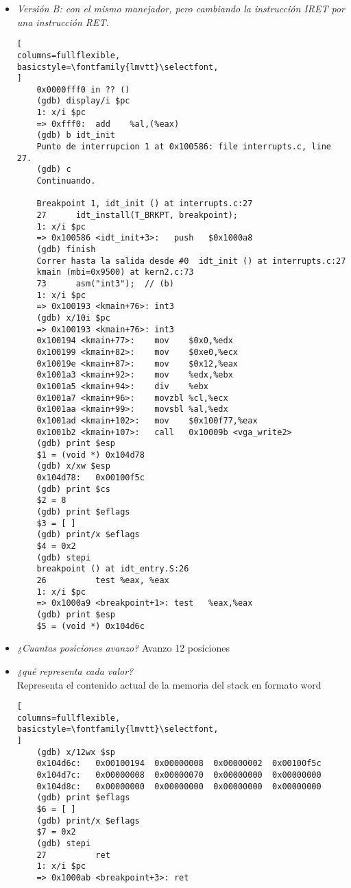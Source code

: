 \documentclass[a4paper, 12pt]{article}
\begin{document}
\begin{itemize}
\begin{lstlisting}[
columns=fullflexible,
basicstyle=\fontfamily{lmvtt}\selectfont,
]
	(gdb) print $cs
	$13 = 8
	(gdb) print $eflags
	$10 = [ ]
	(gdb) print/x $eflags
	$11 = 0x2
\end{lstlisting}
				\item \textit{Versión B: con el mismo manejador, pero cambiando
				la instrucción IRET por una instrucción RET.\\}
\begin{lstlisting}[
columns=fullflexible,
basicstyle=\fontfamily{lmvtt}\selectfont,
]
	0x0000fff0 in ?? ()
	(gdb) display/i $pc
	1: x/i $pc
	=> 0xfff0:	add    %al,(%eax)
	(gdb) b idt_init
	Punto de interrupcion 1 at 0x100586: file interrupts.c, line 27.
	(gdb) c
	Continuando.

	Breakpoint 1, idt_init () at interrupts.c:27
	27	    idt_install(T_BRKPT, breakpoint);
	1: x/i $pc
	=> 0x100586 <idt_init+3>:	push   $0x1000a8
	(gdb) finish
	Correr hasta la salida desde #0  idt_init () at interrupts.c:27
	kmain (mbi=0x9500) at kern2.c:73
	73	    asm("int3");  // (b)
	1: x/i $pc
	=> 0x100193 <kmain+76>:	int3
	(gdb) x/10i $pc
	=> 0x100193 <kmain+76>:	int3
	0x100194 <kmain+77>:	mov    $0x0,%edx
	0x100199 <kmain+82>:	mov    $0xe0,%ecx
	0x10019e <kmain+87>:	mov    $0x12,%eax
	0x1001a3 <kmain+92>:	mov    %edx,%ebx
	0x1001a5 <kmain+94>:	div    %ebx
	0x1001a7 <kmain+96>:	movzbl %cl,%ecx
	0x1001aa <kmain+99>:	movsbl %al,%edx
	0x1001ad <kmain+102>:	mov    $0x100f77,%eax
	0x1001b2 <kmain+107>:	call   0x10009b <vga_write2>
	(gdb) print $esp
	$1 = (void *) 0x104d78
	(gdb) x/xw $esp
	0x104d78:	0x00100f5c
	(gdb) print $cs
	$2 = 8
	(gdb) print $eflags
	$3 = [ ]
	(gdb) print/x $eflags
	$4 = 0x2
	(gdb) stepi
	breakpoint () at idt_entry.S:26
	26	        test %eax, %eax
	1: x/i $pc
	=> 0x1000a9 <breakpoint+1>:	test   %eax,%eax
	(gdb) print $esp
	$5 = (void *) 0x104d6c
\end{lstlisting}
				\item \textit{¿Cuantas posiciones avanzo?}
				Avanzo 12 posiciones
				\item \textit{¿qué representa cada valor?\\}
				Representa el contenido actual de la memoria del stack en
				formato word
\begin{lstlisting}[
columns=fullflexible,
basicstyle=\fontfamily{lmvtt}\selectfont,
]
	(gdb) x/12wx $sp
	0x104d6c:	0x00100194	0x00000008	0x00000002	0x00100f5c
	0x104d7c:	0x00000008	0x00000070	0x00000000	0x00000000
	0x104d8c:	0x00000000	0x00000000	0x00000000	0x00000000
	(gdb) print $eflags
	$6 = [ ]
	(gdb) print/x $eflags
	$7 = 0x2
	(gdb) stepi
	27	        ret
	1: x/i $pc
	=> 0x1000ab <breakpoint+3>:	ret

\end{lstlisting}
\end{itemize}
\end{document}
